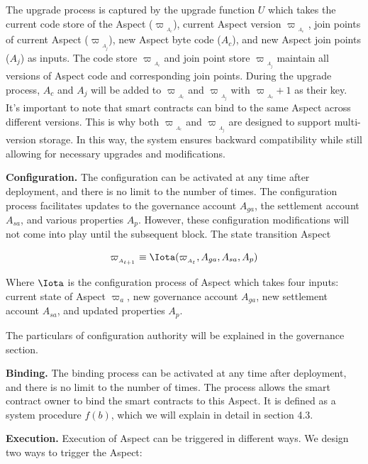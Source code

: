 The upgrade process is captured by the upgrade function $U$ which takes the current code store of the Aspect ($\varpi{_{_{A_c}}}$), current Aspect version $\varpi{_{_{A_v}}}$ , join points of current Aspect ($\varpi{_{_{A_j}}}$), new Aspect byte code ($A_c$), and new Aspect join points ($A_j$) as inputs. The code store $\varpi{_{_{A_c}}}$ and join point store $\varpi{_{_{A_j}}}$ maintain all versions of Aspect code and corresponding join points. During the upgrade process, $A_c$ and $A_j$ will be added to $\varpi{_{_{A_c}}}$ and $\varpi{_{_{A_j}}}$ with $\varpi{_{_{A_v}}} + 1$ as their key. It's important to note that smart contracts can bind to the same Aspect across different versions. This is why both $\varpi{_{_{A_c}}}$ and $\varpi{_{_{A_j}}}$ are designed to support multi-version storage. In this way, the system ensures backward compatibility while still allowing for necessary upgrades and modifications.

\textbf{Configuration.} The configuration can be activated at any time after deployment, and there is no limit to the number of times. The configuration process facilitates updates to the governance account $A_{ga}$, the settlement account $A_{sa}$, and various properties $A_p$. However, these configuration modifications will not come into play until the subsequent block. The state transition Aspect 

\[
\varpi_{_{A_{t+1}}} \equiv \Iota(\varpi_{_{A_t}}, A_{ga},A_{sa},A_p)
\]

Where $\Iota$ is the configuration process of Aspect which takes four inputs: current state of Aspect $\varpi_a$, new governance account $A_{ga}$, new settlement account $A_{sa}$, and updated properties $A_p$.

The particulars of configuration authority will be explained in the governance section.

\textbf{Binding.} The binding process can be activated at any time after deployment, and there is no limit to the number of times. The process allows the smart contract owner to bind the smart contracts to this Aspect. It is defined as a system procedure $f(b)$, which we will explain in detail in section 4.3.

\textbf{Execution.} Execution of Aspect can be triggered in different ways. We design two ways to trigger the Aspect:

